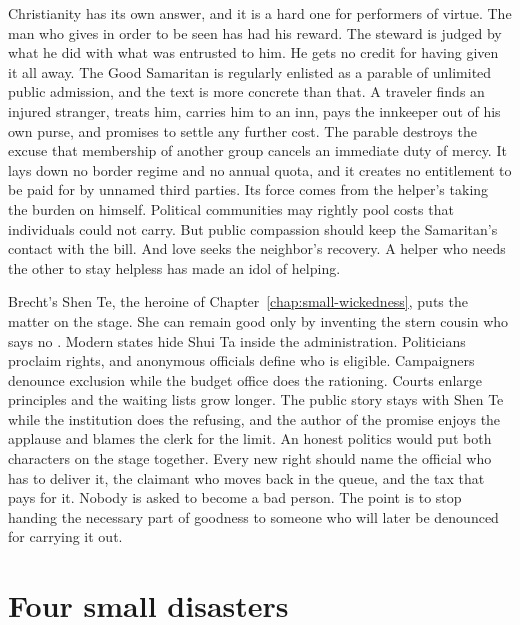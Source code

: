 \documentclass[12pt,a4paper]{book}
\begin{document}
Christianity has its own answer, and it is a hard one for performers of virtue. The man who gives in order to be seen has had his reward. The steward is judged by what he did with what was entrusted to him. He gets no credit for having given it all away. The Good Samaritan is regularly enlisted as a parable of unlimited public admission, and the text is more concrete than that. A traveler finds an injured stranger, treats him, carries him to an inn, pays the innkeeper out of his own purse, and promises to settle any further cost. The parable destroys the excuse that membership of another group cancels an immediate duty of mercy. It lays down no border regime and no annual quota, and it creates no entitlement to be paid for by unnamed third parties. Its force comes from the helper's taking the burden on himself. Political communities may rightly pool costs that individuals could not carry. But public compassion should keep the Samaritan's contact with the bill. And love seeks the neighbor's recovery. A helper who needs the other to stay helpless has made an idol of helping.

Brecht's Shen Te, the heroine of Chapter~\ref{chap:small-wickedness}, puts the matter on the stage. She can remain good only by inventing the stern cousin who says no \cite{Brecht-GMvS}. Modern states hide Shui Ta inside the administration. Politicians proclaim rights, and anonymous officials define who is eligible. Campaigners denounce exclusion while the budget office does the rationing. Courts enlarge principles and the waiting lists grow longer. The public story stays with Shen Te while the institution does the refusing, and the author of the promise enjoys the applause and blames the clerk for the limit. An honest politics would put both characters on the stage together. Every new right should name the official who has to deliver it, the claimant who moves back in the queue, and the tax that pays for it. Nobody is asked to become a bad person. The point is to stop handing the necessary part of goodness to someone who will later be denounced for carrying it out.

\section{Four small disasters}
\end{document}

